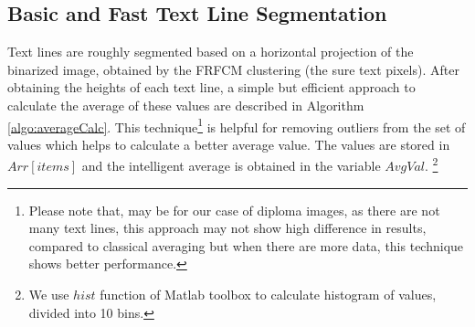 \documentclass[runningheads]{llncs}
\begin{document}
\subsection {Basic and Fast Text Line Segmentation } \label{textlineSeg} Text lines are roughly segmented based on a horizontal projection of the binarized image, obtained by the FRFCM clustering (the sure text pixels). After obtaining the heights of each text line, a simple but efficient approach to calculate the average of these values are described in Algorithm \ref*{algo:averageCalc}. This technique\footnote{Please note that, may be for our case of diploma images, as there are not many text lines, this approach may not show high difference in results, compared to classical averaging but when there are more data, this technique shows better performance.} is helpful for removing outliers from the set of values which helps to calculate a better average value. The values are stored in $Arr[items]$ and the intelligent average is obtained in the variable $AvgVal$. \footnote{We use $hist$ function of Matlab toolbox to calculate histogram of values, divided into 10 bins.} 
\end{document}
